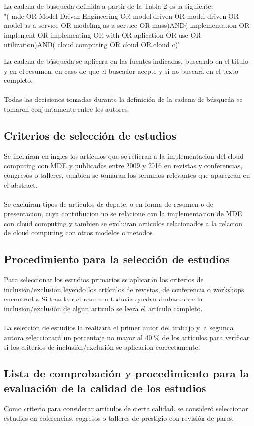 \documentclass{llncs}
\begin{document}
La cadena de busqueda definida a partir de la Tabla 2 es la siguiente: \\
"( mde OR Model Driven Engineering OR model driven OR model driven OR model as a service OR modeling as a service OR mass)AND( implementation OR implement OR implementing OR with OR aplication OR use OR utilization)AND( cloud computing OR  cloud OR cloud c)"

La cadena de búsqueda  se aplicara en las fuentes indicadas, buscando en el título y en el resumen, en caso de que el buscador acepte y si no buscará en el texto completo.\\ \\
Todas las decisiones tomadas durante la definición de la cadena de búsqueda se tomaron conjuntamente entre los autores.

\subsection{Criterios de selección de estudios}
Se incluiran en ingles los artículos que se refieran a la implementacion del cloud computing con MDE y publicados entre 2009 y 2016 en revistas y conferencias, congresos o talleres, tambien se tomaran los terminos relevantes que aparezcan en el abstract.\\\\
Se excluiran tipos de articulos de depate, o en forma de resumen o de presentacion, cuya contribucion no se relacione con la implementacion de MDE con cloud computing y tambien se excluiran articulos relacionados a la relacion de cloud computing con otros modelos o metodos.

\subsection{Procedimiento para la selección de estudios}
Para seleccionar los estudios primarios se aplicarán los criterios de inclusión/exclusión leyendo los artículos de revistas, de conferencia o workshops encontrados.Si tras leer el resumen todavia quedan dudas sobre la inclusión/exclusión de algun articulo se leera el artículo completo.\\ \\
La selección de estudios la realizará el primer autor del trabajo y la segunda autora seleccionará un porcentaje no mayor al 40  \% de los artículos  para verificar si los criterios de inclusión/exclusión se aplicarion correctamente.

\subsection{Lista de comprobación y procedimiento para la evaluación de la calidad de los estudios}
Como criterio para considerar artículos de cierta calidad, se consideró seleccionar estudios en coferencias, cogresos o talleres de prestigio con revisión de pares.
\end{document}
